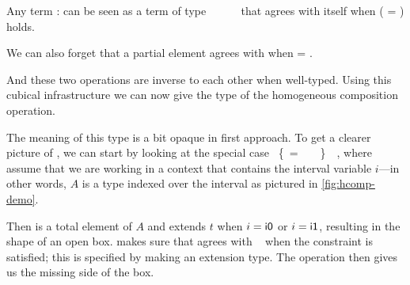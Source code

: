 Any term  :  can be seen as a term of type
~\func{[}~~~~\func{]} that agrees with
itself when ( = ) holds.
%

We can also forget that a partial element agrees with  when
 = .
%

And these two operations are inverse to each other when well-typed. Using
this cubical infrastructure we can now give the type of the
homogeneous composition operation.
%

The meaning of this type is a bit opaque in first approach.
% 
To get a clearer picture of , we can start by looking at the special
case
~\{~=~~~~\}~~,
where assume that we are working in a context that contains the interval 
variable \( i \)---in other words, \( A \) is a type indexed over the interval 
 as pictured in \cref{fig:hcomp-demo}.
 
Then  is a total element of \( A \) and  extends \( t \)
when \( i = \con{i0} \) or \( i = \con{i1} \), resulting in the shape of
an open box.
% 
\CubicalAgda makes sure that  agrees with ~ when the
constraint is satisfied; this is specified by making  an extension type. 
% 
The  operation then gives us the missing side of the box.

